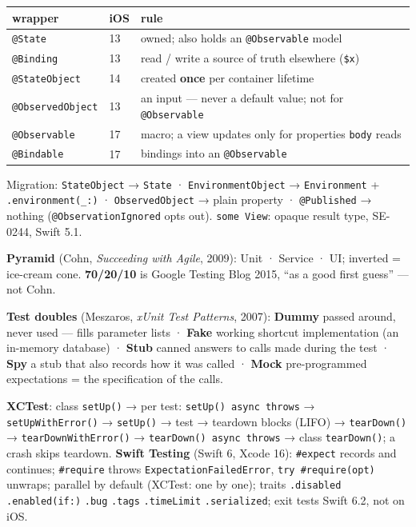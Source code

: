 \documentclass[8pt]{extarticle}
\newcommand\ct[1]{\texttt{#1}}
\newcommand\hd[1]{\par\vspace{3pt}\noindent{\small\bfseries\color{sheetBlue}#1}\par\vspace{1pt}}
\begin{document}
\begin{multicols}{2}
\hd{SwiftUI state}
{\scriptsize\setlength{\tabcolsep}{2pt}
\begin{tabular}{@{}L{17mm}L{5mm}L{55mm}@{}}
\toprule
\textbf{wrapper} & \textbf{iOS} & \textbf{rule}\\
\midrule
\ct{@State} & 13 & owned; also holds an \ct{@Observable} model\\
\ct{@Binding} & 13 & read / write a source of truth elsewhere (\ct{\$x})\\
\ct{@StateObject} & 14 & created \textbf{once} per container lifetime\\
\ct{@ObservedObject} & 13 & an input — never a default value; not for \ct{@Observable}\\
\ct{@Observable} & 17 & macro; a view updates only for properties \ct{body} reads\\
\ct{@Bindable} & 17 & bindings into an \ct{@Observable}\\
\bottomrule
\end{tabular}}
{\scriptsize Migration: \ct{StateObject} → \ct{State} · \ct{EnvironmentObject} → \ct{Environment} +
\ct{.environment(\_:)} · \ct{ObservedObject} → plain property · \ct{@Published} → nothing
(\ct{@ObservationIgnored} opts out). \ct{some View}: opaque result type, SE-0244, Swift 5.1.\par}

\hd{Testing}
{\scriptsize \textbf{Pyramid} (Cohn, \emph{Succeeding with Agile}, 2009): Unit · Service · UI; inverted =
ice-cream cone. \textbf{70/20/10} is Google Testing Blog 2015, ``as a good first guess'' — not Cohn.\par}
{\scriptsize\textbf{Test doubles} (Meszaros, \emph{xUnit Test Patterns}, 2007): \textbf{Dummy} passed
around, never used — fills parameter lists · \textbf{Fake} working shortcut implementation (an
in-memory database) · \textbf{Stub} canned answers to calls made during the test · \textbf{Spy} a stub
that also records how it was called · \textbf{Mock} pre-programmed expectations = the specification of
the calls.\par}
{\scriptsize\textbf{XCTest}: class \ct{setUp()} → per test: \ct{setUp() async throws} → \ct{setUpWithError()}
→ \ct{setUp()} → test → teardown blocks (LIFO) → \ct{tearDown()} → \ct{tearDownWithError()} →
\ct{tearDown() async throws} → class \ct{tearDown()}; a crash skips teardown. \textbf{Swift Testing}
(Swift 6, Xcode 16): \ct{\#expect} records and continues; \ct{\#require} throws
\ct{ExpectationFailedError}, \ct{try \#require(opt)} unwraps; parallel by default (XCTest: one by
one); traits \ct{.disabled} \ct{.enabled(if:)} \ct{.bug} \ct{.tags} \ct{.timeLimit} \ct{.serialized};
exit tests Swift 6.2, not on iOS.\par}


\end{multicols}
\end{document}
